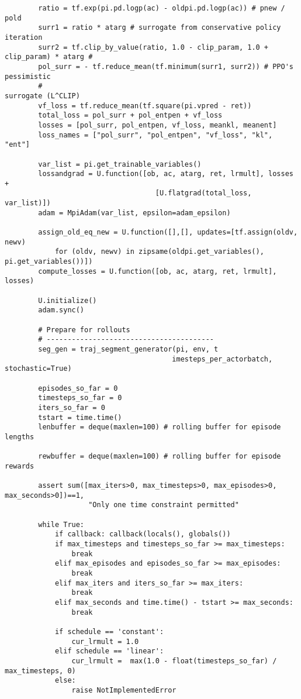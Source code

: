 \begin{verbatim}
        ratio = tf.exp(pi.pd.logp(ac) - oldpi.pd.logp(ac)) # pnew / pold
        surr1 = ratio * atarg # surrogate from conservative policy iteration
        surr2 = tf.clip_by_value(ratio, 1.0 - clip_param, 1.0 + clip_param) * atarg #
        pol_surr = - tf.reduce_mean(tf.minimum(surr1, surr2)) # PPO's pessimistic 
        #                                                       surrogate (L^CLIP)
        vf_loss = tf.reduce_mean(tf.square(pi.vpred - ret))
        total_loss = pol_surr + pol_entpen + vf_loss
        losses = [pol_surr, pol_entpen, vf_loss, meankl, meanent]
        loss_names = ["pol_surr", "pol_entpen", "vf_loss", "kl", "ent"]

        var_list = pi.get_trainable_variables()
        lossandgrad = U.function([ob, ac, atarg, ret, lrmult], losses + 
                                    [U.flatgrad(total_loss, var_list)])
        adam = MpiAdam(var_list, epsilon=adam_epsilon)

        assign_old_eq_new = U.function([],[], updates=[tf.assign(oldv, newv)
            for (oldv, newv) in zipsame(oldpi.get_variables(), pi.get_variables())])
        compute_losses = U.function([ob, ac, atarg, ret, lrmult], losses)

        U.initialize()
        adam.sync()

        # Prepare for rollouts
        # ----------------------------------------
        seg_gen = traj_segment_generator(pi, env, t
                                        imesteps_per_actorbatch, stochastic=True)

        episodes_so_far = 0
        timesteps_so_far = 0
        iters_so_far = 0
        tstart = time.time()
        lenbuffer = deque(maxlen=100) # rolling buffer for episode lengths

        rewbuffer = deque(maxlen=100) # rolling buffer for episode rewards

        assert sum([max_iters>0, max_timesteps>0, max_episodes>0, max_seconds>0])==1, 
                    "Only one time constraint permitted"

        while True:
            if callback: callback(locals(), globals())
            if max_timesteps and timesteps_so_far >= max_timesteps:
                break
            elif max_episodes and episodes_so_far >= max_episodes:
                break
            elif max_iters and iters_so_far >= max_iters:
                break
            elif max_seconds and time.time() - tstart >= max_seconds:
                break

            if schedule == 'constant':
                cur_lrmult = 1.0
            elif schedule == 'linear':
                cur_lrmult =  max(1.0 - float(timesteps_so_far) / max_timesteps, 0)
            else:
                raise NotImplementedError


\end{verbatim}
